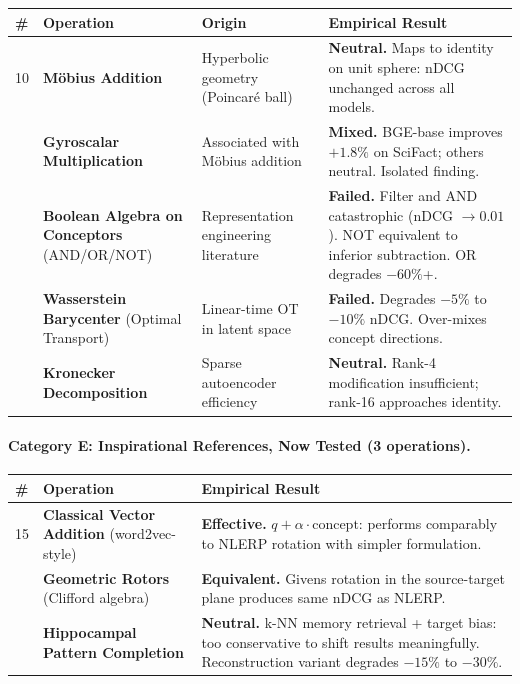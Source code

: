 \documentclass{article}
\begin{document}
\begin{longtable}{>{\raggedright}p{0.3cm} >{\raggedright}p{2.8cm} >{\raggedright}p{3.5cm} p{6.5cm}}
\toprule
\# & Operation & Origin & Empirical Result \\
\midrule
\endhead
10 & \textbf{M\"{o}bius Addition} & Hyperbolic geometry (Poincar\'{e} ball) & \textbf{Neutral.} Maps to identity on unit sphere: nDCG unchanged across all models. \\
\addlinespace
11 & \textbf{Gyroscalar Multiplication} & Associated with M\"{o}bius addition & \textbf{Mixed.} BGE-base improves $+1.8\%$ on SciFact; others neutral. Isolated finding. \\
\addlinespace
12 & \textbf{Boolean Algebra on Conceptors} (AND/OR/NOT) & Representation engineering literature & \textbf{Failed.} Filter and AND catastrophic (nDCG $\to 0.01$). NOT equivalent to inferior subtraction. OR degrades $-60\%$+. \\
\addlinespace
13 & \textbf{Wasserstein Barycenter} (Optimal Transport) & Linear-time OT in latent space & \textbf{Failed.} Degrades $-5\%$ to $-10\%$ nDCG. Over-mixes concept directions. \\
\addlinespace
14 & \textbf{Kronecker Decomposition} & Sparse autoencoder efficiency & \textbf{Neutral.} Rank-4 modification insufficient; rank-16 approaches identity. \\
\bottomrule
\end{longtable}

\paragraph{Category E: Inspirational References, Now Tested (3 operations).}

\begin{longtable}{>{\raggedright}p{0.3cm} >{\raggedright}p{3.5cm} p{9.5cm}}
\toprule
\# & Operation & Empirical Result \\
\midrule
\endhead
15 & \textbf{Classical Vector Addition} (word2vec-style) & \textbf{Effective.} $q + \alpha \cdot \text{concept}$: performs comparably to NLERP rotation with simpler formulation. \\
\addlinespace
16 & \textbf{Geometric Rotors} (Clifford algebra) & \textbf{Equivalent.} Givens rotation in the source-target plane produces same nDCG as NLERP. \\
\addlinespace
17 & \textbf{Hippocampal Pattern Completion} & \textbf{Neutral.} k-NN memory retrieval + target bias: too conservative to shift results meaningfully. Reconstruction variant degrades $-15\%$ to $-30\%$. \\
\bottomrule
\end{longtable}
\end{document}
